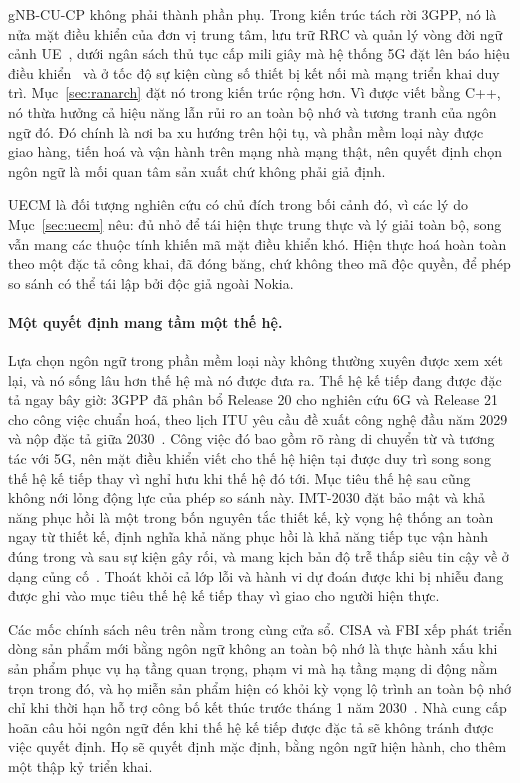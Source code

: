 gNB-CU-CP không phải thành phần phụ. Trong kiến trúc tách rời 3GPP, nó là nửa mặt điều khiển
của đơn vị trung tâm, lưu trữ RRC và quản lý vòng đời ngữ cảnh
UE~\cite{3gpp38401,3gpp38331}, dưới ngân sách thủ tục cấp mili giây mà hệ thống 5G đặt lên
báo hiệu điều khiển~\cite{3gpp38913} và ở tốc độ sự kiện cùng số thiết bị kết nối mà mạng
triển khai duy trì. Mục~\ref{sec:ranarch} đặt nó trong kiến trúc rộng hơn. Vì được viết bằng
C++, nó thừa hưởng cả hiệu năng lẫn rủi ro an toàn bộ nhớ và tương tranh của ngôn ngữ đó. Đó
chính là nơi ba xu hướng trên hội tụ, và phần mềm loại này được giao hàng, tiến hoá và vận
hành trên mạng nhà mạng thật, nên quyết định chọn ngôn ngữ là mối quan tâm sản xuất chứ
không phải giả định.

UECM là đối tượng nghiên cứu có chủ đích trong bối cảnh đó, vì các lý do Mục~\ref{sec:uecm}
nêu: đủ nhỏ để tái hiện thực trung thực và lý giải toàn bộ, song vẫn mang các thuộc tính
khiến mã mặt điều khiển khó. Hiện thực hoá hoàn toàn theo một đặc tả công khai, đã đóng băng,
chứ không theo mã độc quyền, để phép so sánh có thể tái lập bởi độc giả ngoài Nokia.

\paragraph{Một quyết định mang tầm một thế hệ.}
Lựa chọn ngôn ngữ trong phần mềm loại này không thường xuyên được xem xét lại, và nó sống
lâu hơn thế hệ mà nó được đưa ra. Thế hệ kế tiếp đang được đặc tả ngay bây giờ: 3GPP đã
phân bổ Release 20 cho nghiên cứu 6G và Release 21 cho công việc chuẩn hoá, theo lịch ITU
yêu cầu đề xuất công nghệ đầu năm 2029 và nộp đặc tả giữa
2030~\cite{3gpp2024road6g}. Công việc đó bao gồm rõ ràng di chuyển từ và tương tác với 5G, nên
mặt điều khiển viết cho thế hệ hiện tại được duy trì song song thế hệ kế tiếp thay vì nghỉ
hưu khi thế hệ đó tới. Mục tiêu thế hệ sau cũng không nới lỏng động lực của phép so sánh
này. IMT-2030 đặt bảo mật và khả năng phục hồi là một trong bốn nguyên tắc thiết kế, kỳ vọng
hệ thống an toàn ngay từ thiết kế, định nghĩa khả năng phục hồi là khả năng tiếp tục vận hành
đúng trong và sau sự kiện gây rối, và mang kịch bản độ trễ thấp siêu tin cậy về ở dạng củng
cố~\cite{itu2023imt2030}. Thoát khỏi cả lớp lỗi và hành vi dự đoán được khi bị nhiễu đang
được ghi vào mục tiêu thế hệ kế tiếp thay vì giao cho người hiện thực.

Các mốc chính sách nêu trên nằm trong cùng cửa sổ. CISA và FBI xếp phát triển dòng sản phẩm
mới bằng ngôn ngữ không an toàn bộ nhớ là thực hành xấu khi sản phẩm phục vụ hạ tầng quan
trọng, phạm vi mà hạ tầng mạng di động nằm trọn trong đó, và họ miễn sản phẩm hiện có khỏi
kỳ vọng lộ trình an toàn bộ nhớ chỉ khi thời hạn hỗ trợ công bố kết thúc trước tháng 1 năm
2030~\cite{cisa2025badpractices}. Nhà cung cấp hoãn câu hỏi ngôn ngữ đến khi thế hệ kế tiếp
được đặc tả sẽ không tránh được việc quyết định. Họ sẽ quyết định mặc định, bằng ngôn ngữ
hiện hành, cho thêm một thập kỷ triển khai.

